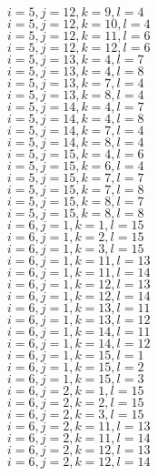 \documentclass[14pt]{article}
\begin{document}
    $i=5,j=12,k=9,l=4 $ \\ 
    $i=5,j=12,k=10,l=4 $ \\ 
    $i=5,j=12,k=11,l=6 $ \\ 
    $i=5,j=12,k=12,l=6 $ \\ 
    $i=5,j=13,k=4,l=7 $ \\ 
    $i=5,j=13,k=4,l=8 $ \\ 
    $i=5,j=13,k=7,l=4 $ \\ 
    $i=5,j=13,k=8,l=4 $ \\ 
    $i=5,j=14,k=4,l=7 $ \\ 
    $i=5,j=14,k=4,l=8 $ \\ 
    $i=5,j=14,k=7,l=4 $ \\ 
    $i=5,j=14,k=8,l=4 $ \\ 
    $i=5,j=15,k=4,l=6 $ \\ 
    $i=5,j=15,k=6,l=4 $ \\ 
    $i=5,j=15,k=7,l=7 $ \\ 
    $i=5,j=15,k=7,l=8 $ \\ 
    $i=5,j=15,k=8,l=7 $ \\ 
    $i=5,j=15,k=8,l=8 $ \\ 
    $i=6,j=1,k=1,l=15 $ \\ 
    $i=6,j=1,k=2,l=15 $ \\ 
    $i=6,j=1,k=3,l=15 $ \\ 
    $i=6,j=1,k=11,l=13 $ \\ 
    $i=6,j=1,k=11,l=14 $ \\ 
    $i=6,j=1,k=12,l=13 $ \\ 
    $i=6,j=1,k=12,l=14 $ \\ 
    $i=6,j=1,k=13,l=11 $ \\ 
    $i=6,j=1,k=13,l=12 $ \\ 
    $i=6,j=1,k=14,l=11 $ \\ 
    $i=6,j=1,k=14,l=12 $ \\ 
    $i=6,j=1,k=15,l=1 $ \\ 
    $i=6,j=1,k=15,l=2 $ \\ 
    $i=6,j=1,k=15,l=3 $ \\ 
    $i=6,j=2,k=1,l=15 $ \\ 
    $i=6,j=2,k=2,l=15 $ \\ 
    $i=6,j=2,k=3,l=15 $ \\ 
    $i=6,j=2,k=11,l=13 $ \\ 
    $i=6,j=2,k=11,l=14 $ \\ 
    $i=6,j=2,k=12,l=13 $ \\ 
    $i=6,j=2,k=12,l=14 $ \\ 
\end{document}
